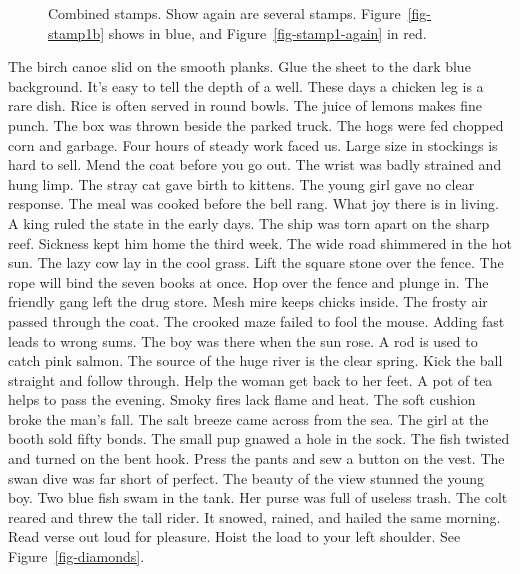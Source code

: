\documentclass[
  letterpaper,
  DIV=11,
  numbers=noendperiod]{scrartcl}
\begin{document}
\begin{figure}
\begin{minipage}[t]{\linewidth}
{{}

}

\end{minipage}%

\caption{\label{fig-combined}Combined stamps. Show again are several
stamps. Figure~\ref{fig-stamp1b} shows in blue, and
Figure~\ref{fig-stamp1-again} in red.}

\end{figure}

The birch canoe slid on the smooth planks. Glue the sheet to the dark
blue background. It's easy to tell the depth of a well. These days a
chicken leg is a rare dish. Rice is often served in round bowls. The
juice of lemons makes fine punch. The box was thrown beside the parked
truck. The hogs were fed chopped corn and garbage. Four hours of steady
work faced us. Large size in stockings is hard to sell. Mend the coat
before you go out. The wrist was badly strained and hung limp. The stray
cat gave birth to kittens. The young girl gave no clear response. The
meal was cooked before the bell rang. What joy there is in living. A
king ruled the state in the early days. The ship was torn apart on the
sharp reef. Sickness kept him home the third week. The wide road
shimmered in the hot sun. The lazy cow lay in the cool grass. Lift the
square stone over the fence. The rope will bind the seven books at once.
Hop over the fence and plunge in. The friendly gang left the drug store.
Mesh mire keeps chicks inside. The frosty air passed through the coat.
The crooked maze failed to fool the mouse. Adding fast leads to wrong
sums. The boy was there when the sun rose. A rod is used to catch pink
salmon. The source of the huge river is the clear spring. Kick the ball
straight and follow through. Help the woman get back to her feet. A pot
of tea helps to pass the evening. Smoky fires lack flame and heat. The
soft cushion broke the man's fall. The salt breeze came across from the
sea. The girl at the booth sold fifty bonds. The small pup gnawed a hole
in the sock. The fish twisted and turned on the bent hook. Press the
pants and sew a button on the vest. The swan dive was far short of
perfect. The beauty of the view stunned the young boy. Two blue fish
swam in the tank. Her purse was full of useless trash. The colt reared
and threw the tall rider. It snowed, rained, and hailed the same
morning. Read verse out loud for pleasure. Hoist the load to your left
shoulder. See Figure~\ref{fig-diamonds}.
\end{document}
